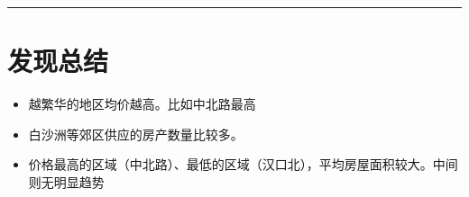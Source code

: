 \documentclass[
]{article}
\begin{document}
\begin{center}\rule{0.5\linewidth}{0.5pt}\end{center}

\section{发现总结}\label{ux53d1ux73b0ux603bux7ed3}

\begin{itemize}
\item
  越繁华的地区均价越高。比如中北路最高
\item
  白沙洲等郊区供应的房产数量比较多。
\item
  价格最高的区域（中北路）、最低的区域（汉口北），平均房屋面积较大。中间则无明显趋势
\end{itemize}
\end{document}
